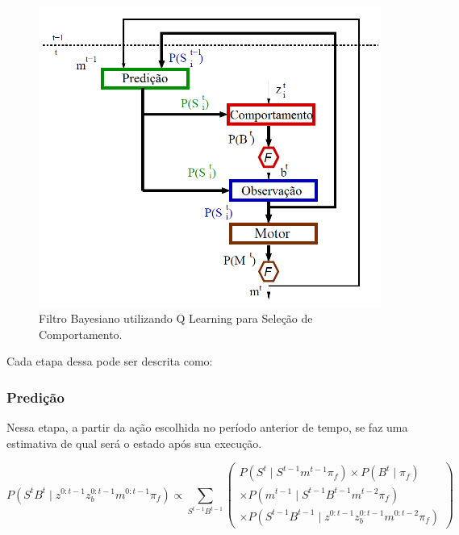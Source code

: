 \begin{figure}[h!]
    \centering
    \includegraphics[width=120mm]{images/modelo_probabilistico-carla}
    \caption{\label{img:ModeloProbabilisticoCarla}Filtro Bayesiano utilizando Q Learning para Seleção de Comportamento.}
\end{figure}

Cada etapa dessa pode ser descrita como:


\subsubsection{Predição}

Nessa etapa, a partir da ação escolhida no período anterior de tempo, se faz uma estimativa de qual será o estado após sua execução.

\begin{equation}
    P \left( S^t B^t \mid z^{0: t-1} z_b^{0: t-1} m^{0: t-1} \pi_f \right) \propto \sum\limits_{S^{t-1} B^{t-1}}
        \left(
            \begin{array}{l}
                P \left( S^t \mid S^{t-1} m^{t-1} \pi_f \right) \times P \left( B^t \mid \pi_f \right) \\
                \times P \left( m^{t-1} \mid S^{t-1} B^{t-1} m^{t-2} \pi_f \right)\\
                \times P \left( S^{t-1} B^{t-1} \mid z^{0: t-1} z_b^{0: t-1} m^{0: t-2} \pi_f \right)
            \end{array}
        \right)
\end{equation}



